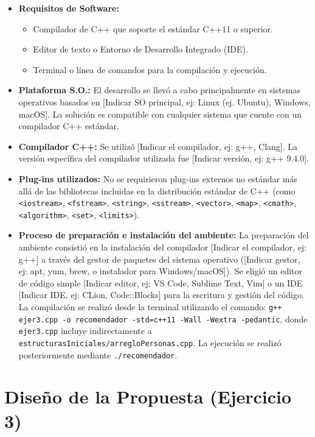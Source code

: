 \documentclass{article}
\begin{document}
\begin{itemize}[label=\textbullet] %
    \item \textbf{Requisitos de Software:}
    \begin{itemize}[label=\textendash] %
        \item Compilador de C++ que soporte el estándar C++11 o superior.
        \item Editor de texto o Entorno de Desarrollo Integrado (IDE).
        \item Terminal o línea de comandos para la compilación y ejecución.
    \end{itemize}
    \item \textbf{Plataforma S.O.:}
    El desarrollo se llevó a cabo principalmente en sistemas operativos basados en [Indicar SO principal, ej: Linux (ej. Ubuntu), Windows, macOS]. La solución es compatible con cualquier sistema que cuente con un compilador C++ estándar.
    \item \textbf{Compilador C++:}
    Se utilizó [Indicar el compilador, ej: g++, Clang]. La versión específica del compilador utilizada fue [Indicar versión, ej: g++ 9.4.0].
    \item \textbf{Plug-ins utilizados:}
    No se requirieron plug-ins externos no estándar más allá de las bibliotecas incluidas en la distribución estándar de C++ (como \texttt{<iostream>}, \texttt{<fstream>}, \texttt{<string>}, \texttt{<sstream>}, \texttt{<vector>}, \texttt{<map>}, \texttt{<cmath>}, \texttt{<algorithm>}, \texttt{<set>}, \texttt{<limits>}).
    \item \textbf{Proceso de preparación e instalación del ambiente:}
    La preparación del ambiente consistió en la instalación del compilador [Indicar el compilador, ej: g++] a través del gestor de paquetes del sistema operativo ([Indicar gestor, ej: apt, yum, brew, o instalador para Windows/macOS]). Se eligió un editor de código simple [Indicar editor, ej: VS Code, Sublime Text, Vim] o un IDE [Indicar IDE, ej: CLion, Code::Blocks] para la escritura y gestión del código. La compilación se realizó desde la terminal utilizando el comando: \texttt{g++ ejer3.cpp -o recomendador -std=c++11 -Wall -Wextra -pedantic}, donde \texttt{ejer3.cpp} incluye indirectamente a \texttt{estructurasIniciales/arregloPersonas.cpp}. La ejecución se realizó posteriormente mediante \texttt{./recomendador}.
\end{itemize}

\section{Diseño de la Propuesta (Ejercicio 3)}
\end{document}
